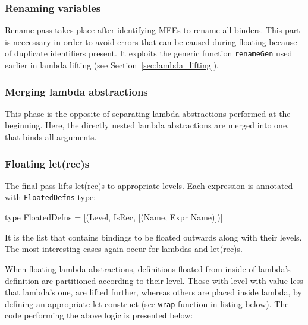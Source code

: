 \documentclass[12pt,a4paper]{report}
\begin{document}
\subsubsection{Renaming variables}
Rename pass takes place after identifying MFEs to rename all binders. This
part is neccessary in order to avoid errors that can be caused during floating
because of duplicate identifiers present. It exploits the generic function
\texttt{renameGen} used earlier in lambda lifting (see
Section~\ref{sec:lambda_lifting}).

\subsubsection{Merging lambda abstractions}
This phase is the opposite of separating lambda abstractions performed at the
beginning. Here, the directly nested lambda abstractions are merged into one,
that binds all arguments.

\subsubsection{Floating let(rec)s}
The final pass lifts let(rec)s to appropriate levels. Each expression is
annotated with \texttt{FloatedDefns} type:

\vspace*{0.2in}
\begin{code}[style=haskell]
  type FloatedDefns = [(Level, IsRec, [(Name, Expr Name)])]
\end{code}

It is the list that contains bindings to be floated outwards along with their
levels. The most interesting cases again occur for lambdas and let(rec)s.

When floating lambda abstractions, definitions floated from inside of lambda's
definition are partitioned according to their level. Those with level with
value less that lambda's one, are lifted further, whereas others are placed
inside lambda, by defining an appropriate let construct (see \texttt{wrap}
function in listing below). The code performing the above logic is presented
below:

\vspace*{0.2in}
\end{document}
